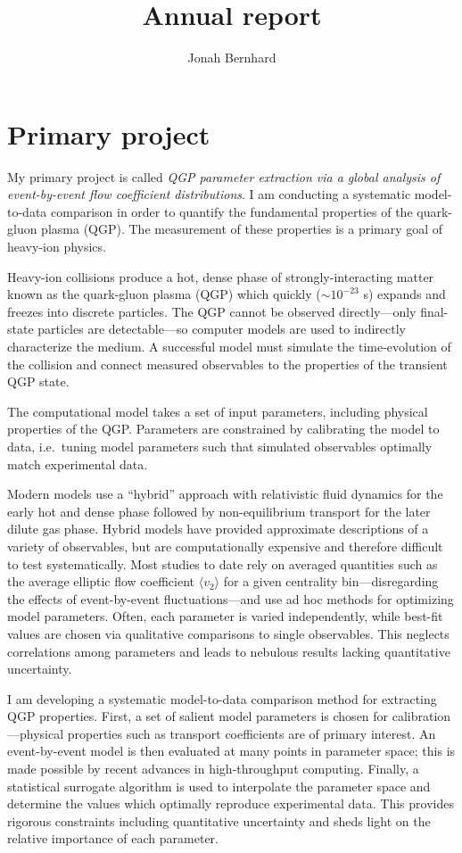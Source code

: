 \documentclass[letterpaper,10pt]{article}
\title{Annual report}
\author{Jonah Bernhard}
\begin{document}
\maketitle



\section{Primary project}

My primary project is called \emph{QGP parameter extraction via a global analysis of event-by-event flow coefficient distributions}.  I am
conducting a systematic model-to-data comparison in order to quantify the fundamental properties of the quark-gluon plasma (QGP).  
The measurement of these properties is a primary goal of heavy-ion physics.

Heavy-ion collisions produce a hot, dense phase of strongly-interacting matter known as the quark-gluon plasma (QGP) which quickly
(${\sim}10^{-23}$ s) expands and freezes into discrete particles.  The QGP cannot be observed directly---only final-state particles are
detectable---so computer models are used to indirectly characterize the medium.  A successful model must simulate the time-evolution of the
collision and connect measured observables to the properties of the transient QGP state.

The computational model takes a set of input parameters, including physical properties of the QGP.  Parameters are constrained by
calibrating the model to data, i.e.\ tuning model parameters such that simulated observables optimally match experimental data.  

Modern models use a ``hybrid'' approach with relativistic fluid dynamics for the early hot and dense phase followed by non-equilibrium
transport for the later dilute gas phase.  Hybrid models have provided approximate descriptions of a variety of observables, but are
computationally expensive and therefore difficult to test systematically.  Most studies to date rely on averaged quantities such as the
average elliptic flow coefficient $\langle v_2 \rangle$ for a given centrality bin---disregarding the effects of event-by-event
fluctuations---and use ad hoc methods for optimizing model parameters.  Often, each parameter is varied independently, while best-fit values
are chosen via qualitative comparisons to single observables.  This neglects correlations among parameters and leads to nebulous results
lacking quantitative uncertainty.

I am developing a systematic model-to-data comparison method for extracting QGP properties.  First, a set of salient model parameters is
chosen for calibration---physical properties such as transport coefficients are of primary interest.  An event-by-event model is then
evaluated at many points in parameter space; this is made possible by recent advances in high-throughput computing.  Finally, a statistical
surrogate algorithm is used to interpolate the parameter space and determine the values which optimally reproduce experimental data.  This
provides rigorous constraints including quantitative uncertainty and sheds light on the relative importance of each parameter.  
\end{document}
